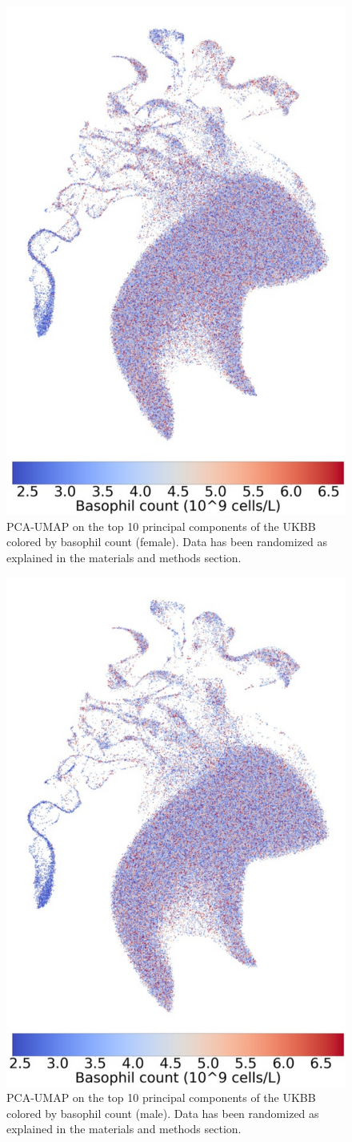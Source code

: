 \documentclass[12pt]{pnas-new}
\begin{document}
\begin{figure}
    \centering
    \includegraphics[width=0.4\columnwidth]{images/UKBB_UMAP_PC10_NN15_MD05_2018328174511_201871417039_basophill_count_pct5_f.pdf}
    \caption{PCA-UMAP on the top 10 principal components of the UKBB colored by basophil count (female). Data has been randomized as explained in the materials and methods section.}
    \label{fig:supp_ukbb_basophill_f}
\end{figure}

\begin{figure}
    \centering
    \includegraphics[width=0.4\columnwidth]{images/UKBB_UMAP_PC10_NN15_MD05_2018328174511_201871417039_basophill_count_pct5_m.pdf}
    \caption{PCA-UMAP on the top 10 principal components of the UKBB colored by basophil count (male). Data has been randomized as explained in the materials and methods section.}
    \label{fig:supp_ukbb_basophill_m}
\end{figure}
\end{document}
